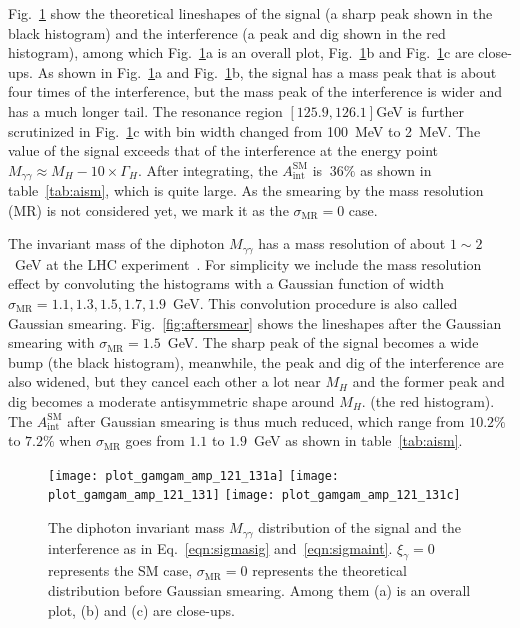 \documentclass[twocolumn,
prd,amssymb,amsmath,preprintnumbers,
floatfix,aps,nofootinbib]{revtex4-1}
\newcommand{\red}{\color{red}}
\newcommand{\black}{\color{black}}
\begin{document}
Fig.~\ref{fig:beforesmear} show
the theoretical lineshapes of the signal (a sharp peak shown in the black histogram) and the interference (a peak and dig shown in the red histogram), among which
Fig.~\ref{fig:beforesmear}a is an overall plot, Fig.~\ref{fig:beforesmear}b and Fig.~\ref{fig:beforesmear}c are close-ups.
As shown in Fig.~\ref{fig:beforesmear}a and Fig.~\ref{fig:beforesmear}b, the signal has a mass peak that is about four times of the interference, but the mass peak of the interference is wider and has a much longer tail.
The resonance region $[125.9, 126.1]$GeV is further scrutinized in Fig.~\ref{fig:beforesmear}c with bin width changed from 100~MeV to 2~MeV.
 The value of the signal exceeds that of the interference at the energy point
 $M_{\gamma\gamma}\approx M_H-10\times\Gamma_H$. 
 After integrating, the $A_{\text{int}}^{\text{SM}}$ is $~36\%$ as
shown in table~\ref{tab:aism}, which is quite large.
 As the smearing by the mass resolution (MR) is not considered yet,
 we mark it as the $\sigma_{\text{MR}}=0$ case.

The invariant mass of the diphoton $M_{\gamma\gamma}$ has a mass resolution
of about $1\sim2$~GeV at the LHC experiment~\cite{CMS:2017rli}.
For simplicity we include the mass resolution effect by convoluting
the histograms with a Gaussian function of width
$\sigma_{\text{MR}}=1.1, 1.3, 1.5, 1.7, 1.9$~GeV.
This convolution procedure is also called Gaussian smearing.
Fig.~\ref{fig:aftersmear} shows the lineshapes after the Gaussian smearing
with $\sigma_{\text{MR}}=1.5$~GeV.
The sharp peak of the signal becomes a wide bump (the black histogram),
meanwhile, the peak and dig of the interference are also widened,
but they cancel each other a lot near $M_H$ and
the former
peak and dig becomes a moderate antisymmetric shape around $M_H$.  \black
(the red histogram).
The $A_{\text{int}}^{\text{SM}}$ after Gaussian smearing is thus much reduced,
which range from $10.2\%$ to $7.2\%$ when $\sigma_{\text{MR}}$ goes from $1.1$ to $1.9$~GeV
as shown in table~\ref{tab:aism}.

 \begin{figure}[htbp]
\begin{center}
\texttt{[image: plot\_gamgam\_amp\_121\_131a]}
\texttt{[image: plot\_gamgam\_amp\_121\_131]}
\texttt{[image: plot\_gamgam\_amp\_121\_131c]}
\end{center}
\caption{ The diphoton invariant mass $M_{\gamma\gamma}$ distribution of
the signal and the interference as in
Eq.~\eqref{eqn:sigmasig} and~\eqref{eqn:sigmaint}. $\xi_\gamma=0$
represents the SM case, $\sigma_{\text{MR}}=0$ represents
the theoretical distribution before Gaussian smearing.
Among them (a) is an overall plot, (b) and (c) are close-ups.
 }
\label{fig:beforesmear}
\end{figure}
\end{document}

